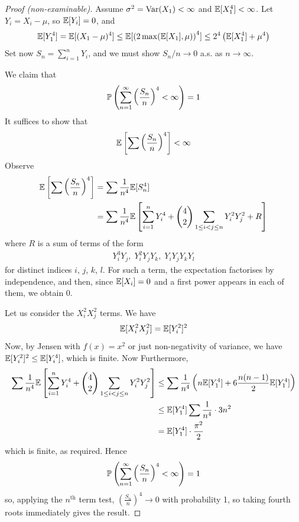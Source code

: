 \documentclass{../template/note}
\begin{document}
    \begin{proof}[Proof (non-examinable)]
        Assume \(\sigma^2 = \operatorname{Var}(X_1) < \infty\) and \(\mathbb E[X_1^4] < \infty\). Let \(Y_i = X_i - \mu\), so \(\mathbb E[Y_i] = 0\), and 
        \begin{align*}
            \mathbb E[Y_1^4] = \mathbb E[(X_1-\mu)^4] \leq \mathbb E[\left(2\max(\mathbb E[X_1], \mu)\right)^4] \leq 2^4 \left(\mathbb E[X_1^4]+\mu^4\right)
        \end{align*}
        Set now \(S_n = \sum_{i=1}^n Y_i\), and we must show \(S_n/n \to 0\) a.s. as \(n \to \infty\).

        We claim that
        \begin{align*}
            \mathbb P\left(\sum_{n=1}^\infty \left(\frac{S_n}n\right)^4 < \infty\right) = 1
        \end{align*}
        It suffices to show that
        \begin{align*}
            \mathbb E\left[\sum \left(\frac{S_n}n\right)^4\right] < \infty
        \end{align*}
        Observe
        \begin{align*}
            \mathbb E\left[\sum \left(\frac{S_n}n\right)^4\right] &= \sum \frac{1}{n^4} \mathbb E[S_n^4] \\
            &= \sum \frac{1}{n^4} \mathbb E\left[\sum_{i=1}^n Y_i^4 + \binom 4 2 \sum_{1\leq i < j \leq n} Y_i^2 Y_j^2 + R\right]
        \end{align*}
        where \(R\) is a sum of terms of the form
        \begin{align*}
            Y_i^3Y_j, \; Y_i^2Y_jY_k, \; Y_iY_jY_kY_l
        \end{align*}
        for distinct indices \(i\), \(j\), \(k\), \(l\). For such a term, the expectation factorises by independence, and then, since \(\mathbb E[X_i] = 0\) and a first power appears in each of them, we obtain 0.

        Let us consider the \(X_i^2X_j^2\) terms. We have
        \begin{align*}
            \mathbb E[X_i^2X_j^2] = \mathbb E[Y_i^2]^2
        \end{align*}
        Now, by Jensen with \(f(x) = x^2\) or just non-negativity of variance, we have \(\mathbb E[Y_i^2]^2 \leq \mathbb E[Y_i^4]\), which is finite. Now
        Furthermore,
        \begin{align*}
            \sum \frac 1{n^4} \mathbb E\left[\sum_{i=1}^n Y_i^4 + \binom 4 2 \sum_{1 \leq i < j \leq n}Y_i^2Y_j^2\right] &\leq \sum \frac 1{n^4} \left(n \mathbb E[Y_1^4] + 6\frac{n(n-1)}{2} \mathbb E[Y_1^4]\right) \\
            &\leq \mathbb E[Y_1^4] \sum \frac{1}{n^4} \cdot 3n^2 \\
            &= \mathbb E[Y_1^4] \cdot \frac{\pi^2}{2} 
        \end{align*}
        which is finite, as required. Hence 
        \begin{align*}
            \mathbb P\left(\sum_{n=1}^\infty \left(\frac{S_n}n\right)^4 < \infty\right) = 1
        \end{align*}
        so, applying the \(n^\text{th}\) term test, \(\left(\frac{S_n}{n}\right)^4 \to 0\) with probability 1, so taking fourth roots immediately gives the result.
    \end{proof}
    
\end{document}

